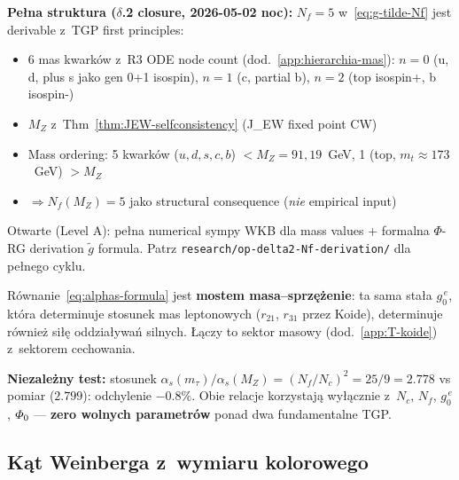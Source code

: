 \begin{proposition}
\medskip\noindent
\textbf{Pe\l{}na struktura ($\delta$.2 closure, 2026-05-02 noc):}
$N_f = 5$ w~\eqref{eq:g-tilde-Nf} jest derivable z~TGP first principles:
\begin{itemize}[nosep]
  \item 6 mas kwark\'ow z~R3 ODE node count (dod.~\ref{app:hierarchia-mas}):
        $n=0$ (u, d, plus s jako gen 0+1 isospin),
        $n=1$ (c, partial b),
        $n=2$ (top isospin+, b isospin-)
  \item $M_Z$ z~Thm~\ref{thm:JEW-selfconsistency} (J\_EW fixed point CW)
  \item Mass ordering: 5 kwark\'ow ($u, d, s, c, b$) $< M_Z = 91{,}19$~GeV,
        1 (top, $m_t \approx 173$~GeV) $> M_Z$
  \item $\Rightarrow N_f(M_Z) = 5$ jako structural consequence (\emph{nie}
        empirical input)
\end{itemize}
Otwarte (Level A): pe\l{}na numerical sympy WKB dla mass values + formalna
$\Phi$-RG derivation $\tilde{g}$ formula. Patrz
\texttt{research/op-delta2-Nf-derivation/} dla pe\l{}nego cyklu.
\end{proposition}

\begin{remark}\label{rem:mass-coupling-bridge}
R\'ownanie~\eqref{eq:alphas-formula} jest \textbf{mostem
masa--sprz\k{e}\.zenie}: ta sama sta\l{}a $g_0^{\,e}$, kt\'ora
determinuje stosunek mas leptonowych ($r_{21}$, $r_{31}$ przez Koide),
determinuje r\'ownie\.z si\l{}\k{e} oddzia\l{}ywa\'n silnych.
\L{}\k{a}czy to sektor masowy (dod.~\ref{app:T-koide})
z~sektorem cechowania.

\medskip\noindent\textbf{Niezale\.zny test:}
stosunek $\alpha_s(m_\tau)/\alpha_s(M_Z) = (N_f/N_c)^2 = 25/9 = 2.778$
vs pomiar ($2.799$): odchylenie $-0.8\%$.
Obie relacje korzystaj\k{a} wy\l{}\k{a}cznie z~$N_c$, $N_f$,
$g_0^{\,e}$, $\varPhi_0$ --- \textbf{zero wolnych parametr\'ow}
ponad dwa fundamentalne TGP.
\end{remark}

\subsection{K\k{a}t Weinberga z~wymiaru kolorowego}%
\label{ssec:sin2thetaW}


